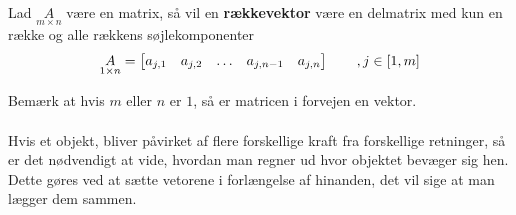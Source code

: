 \begin{defn}[Rækkevektor]
Lad $\underset{m \times n}{A}$ være en matrix, så vil en \textbf{rækkevektor} være en delmatrix med kun en række og alle rækkens søjlekomponenter
\begin{align*}
\underset{1 \times n}{A} = 
\rvect{a_{j,1} & a_{j,2} & \dots & a_{j,n-1} & a_{j,n}}
\qquad , j\in [1,m]%
\end{align*}
\end{defn}
Bemærk at hvis $m$ eller $n$ er $1$, så er matricen i forvejen en vektor.\\
\\
Hvis et objekt, bliver påvirket af flere forskellige kraft fra forskellige retninger, så er det nødvendigt at vide, hvordan man regner ud hvor objektet bevæger sig hen.%
Dette gøres ved at sætte vetorene i forlængelse af hinanden, det vil sige at man lægger dem sammen. 
